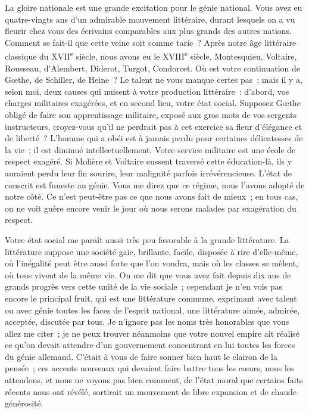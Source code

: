 \documentclass[french,twoside]{book} %
\newcommand\persName[1]{#1}
\begin{document}
La gloire nationale est une grande excitation pour le génie national. Vous avez eu quatre-vingts ans d’un admirable mouvement littéraire, durant lesquels on a vu fleurir chez vous des écrivains comparables aux plus grands des autres nations. Comment se fait-il que cette veine soit comme tarie ? Après notre âge littéraire classique du XVII\textsuperscript{e} siècle, nous avons eu le XVIII\textsuperscript{e} siècle, {\persName Montesquieu}, {\persName Voltaire}, {\persName Rousseau}, {\persName d’Alembert}, {\persName Diderot}, {\persName Turgot}, {\persName Condorcet}. Où est votre continuation de {\persName Gœthe}, de {\persName Schiller}, de {\persName Heine} ? Le talent ne vous manque certes pas ; mais il y a, selon moi, deux causes qui nuisent à votre production littéraire : d’abord, vos charges militaires exagérées, et en second lieu, votre état social. Supposez {\persName Gœthe} obligé de faire son apprentissage militaire, exposé aux gros mots de vos sergents instructeurs, croyez-vous qu’il ne perdrait pas à cet exercice sa fleur d’élégance et de liberté ? L’homme qui a obéi est à jamais perdu pour certaines délicatesses de la vie ; il est diminué intellectuellement. Votre service militaire est une école de respect exagéré. Si {\persName Molière} et {\persName Voltaire} eussent traversé cette éducation-là, ils y auraient perdu leur fin sourire, leur malignité parfois irrévérencieuse. L’état de conscrit est funeste au génie. Vous me direz que ce régime, nous l’avons adopté de notre côté. Ce n’est peut-être pas ce que nous avons fait de mieux ; en tous cas, on ne voit guère encore venir le jour où nous serons malades par exagération du respect.\par
Votre état social me paraît aussi très peu favorable à la grande littérature. La littérature suppose une société gaie, brillante, facile, disposée à rire d’elle-même, où l’inégalité peut être aussi forte que l’on voudra, mais où les classes se mêlent, où tous vivent de la même vie. On me dit que vous avez fait depuis dix ans de grands progrès vers cette unité de la vie sociale ; cependant je n’en vois pas encore le principal fruit, qui est une littérature commune, exprimant avec talent ou avec génie toutes les faces de l’esprit national, une littérature aimée, admirée, acceptée, discutée par tous. Je n’ignore pas les noms très honorables que vous allez me citer ; je ne peux trouver néanmoins que votre nouvel empire ait réalisé ce qu’on devait attendre d’un gouvernement concentrant en lui toutes les forces du génie allemand. C’était à vous de faire sonner bien haut le clairon de la pensée ; ces accents nouveaux qui devaient faire battre tous les cœurs, nous les attendons, et nous ne voyons pas bien comment, de l’état moral que certains faits récents nous ont révélé, sortirait un mouvement de libre expansion et de chaude générosité.\par
\end{document}
